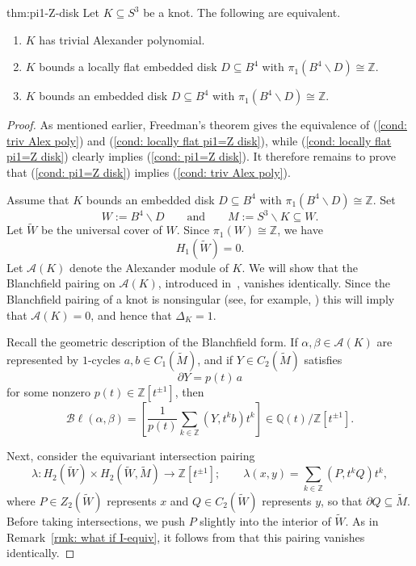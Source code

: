 \documentclass[a4paper, 11pt]{amsart}
\theoremstyle{definition}
\newcommand{\Z}{\mathbb{Z}}
\newcommand{\Bl}{\mathcal{B}\ell}
\newcommand{\pref}[1]{(\ref{#1})}
\begin{document}
\begin{reptheorem}{thm:pi1-Z-disk}
Let $K\subseteq S^3$ be a knot. The following are equivalent.
\begin{enumerate}
\item \label{cond: triv Alex poly} $K$ has trivial Alexander polynomial.
\item \label{cond: locally flat pi1=Z disk} $K$ bounds a locally flat embedded disk $D\subseteq B^4$ with $\pi_1(B^4\smallsetminus D)\cong \Z$.
\item \label{cond: pi1=Z disk} $K$ bounds an embedded disk $D\subseteq B^4$ with $\pi_1(B^4\smallsetminus D)\cong \Z$.
\end{enumerate}
\end{reptheorem}

\begin{proof}

As mentioned earlier, Freedman's theorem gives the equivalence of
\pref{cond: triv Alex poly} and \pref{cond: locally flat pi1=Z disk}, while
\pref{cond: locally flat pi1=Z disk} clearly implies
\pref{cond: pi1=Z disk}. It therefore remains to prove that
\pref{cond: pi1=Z disk} implies \pref{cond: triv Alex poly}.

Assume that \(K\) bounds an embedded disk \(D \subseteq B^4\) with
\(\pi_1(B^4 \smallsetminus D) \cong \mathbb{Z}\). Set
\[
W := B^4 \smallsetminus D
\qquad\text{and}\qquad
M := S^3 \smallsetminus K \subseteq W.
\]
Let \(\widetilde{W}\) be the universal cover of \(W\). Since
\(\pi_1(W) \cong \mathbb{Z}\), we have
\[
H_1(\widetilde{W}) = 0.
\]
Let \(\mathcal{A}(K)\) denote the Alexander module of \(K\). We will show that the Blanchfield pairing on \(\mathcal{A}(K)\), introduced in~\cite{Blanchfield57}, vanishes identically. Since the Blanchfield pairing of a knot is nonsingular (see, for example, \cite[Corollary 1.6]{FrPo17})
this will imply that \(\mathcal{A}(K)=0\), and hence that \(\Delta_K = 1\).

Recall the geometric description of the Blanchfield form. If
\(\alpha,\beta \in \mathcal{A}(K)\) are represented by \(1\)-cycles
\(a,b \in C_1(\widetilde{M})\),
and if \(Y \in C_2(\widetilde{M})\)
satisfies
\[
\partial Y = p(t)\,a
\]
for some nonzero \(p(t) \in \mathbb{Z}[t^{\pm 1}]\), then
\[
\Bl(\alpha,\beta)
=
\left[
\frac{1}{p(t)}
\sum_{k\in \mathbb{Z}} (Y,t^k b)t^k
\right]
\in \mathbb{Q}(t)/\mathbb{Z}[t^{\pm 1}].
\]


Next, consider the equivariant intersection pairing
\[
\lambda \colon
H_2(\widetilde{W}) \times H_2(\widetilde{W},\widetilde{M})
\longrightarrow
\mathbb{Z}[t^{\pm 1}];
\qquad
\lambda(x,y)
=
\sum_{k\in\mathbb{Z}} (P,t^k Q)t^k,
\]
where \(P \in Z_2(\widetilde{W})\) represents \(x\) and
\(Q \in C_2(\widetilde{W})\) represents \(y\), so that
\(\partial Q \subseteq \widetilde{M}\). Before taking intersections,
we push \(P\) slightly into the interior of \(\widetilde{W}\).
As in Remark~\ref{rmk: what if I-equiv}, it follows from
\cite[Lemma~5]{KojYam79} that this pairing vanishes identically.




\end{proof}
\end{document}
